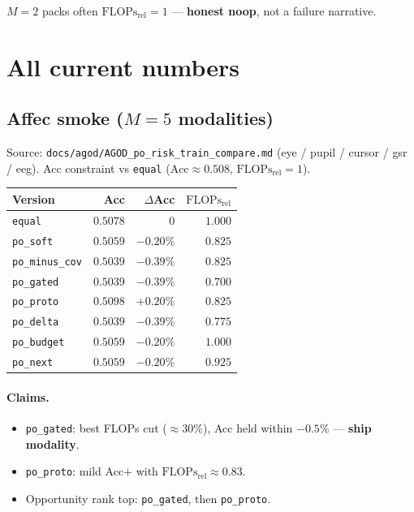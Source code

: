 \documentclass[11pt]{article}
\newcommand{\Flops}{\mathrm{FLOPs}_{\mathrm{rel}}}
\newcommand{\Acc}{\mathrm{Acc}}
\begin{document}
$M{=}2$ packs often $\Flops{=}1$ --- \textbf{honest noop}, not a failure
narrative.

\section{All current numbers}
\label{sec:data}

\subsection{Affec smoke ($M{=}5$ modalities)}
Source: \texttt{docs/agod/AGOD\_po\_risk\_train\_compare.md}
(eye / pupil / cursor / gsr / eeg).
Acc constraint vs \texttt{equal} ($\Acc\approx0.508$, $\Flops{=}1$).

\begin{center}
\small
\begin{tabular}{@{}lrrr@{}}
\toprule
Version & Acc & $\Delta$Acc & $\Flops$ \\
\midrule
\texttt{equal}       & $0.5078$ & $0$        & $1.000$ \\
\texttt{po\_soft}    & $0.5059$ & $-0.20\%$  & $0.825$ \\
\texttt{po\_minus\_cov}& $0.5039$ & $-0.39\%$ & $0.825$ \\
\texttt{po\_gated}   & $0.5039$ & $-0.39\%$  & $\mathbf{0.700}$ \\
\texttt{po\_proto}   & $0.5098$ & $+0.20\%$  & $0.825$ \\
\texttt{po\_delta}   & $0.5039$ & $-0.39\%$  & $0.775$ \\
\texttt{po\_budget}  & $0.5059$ & $-0.20\%$  & $1.000$ \\
\texttt{po\_next}    & $0.5059$ & $-0.20\%$  & $0.925$ \\
\bottomrule
\end{tabular}
\end{center}

\paragraph{Claims.}
\begin{itemize}[leftmargin=1.2em,itemsep=1pt]
  \item \texttt{po\_gated}: best FLOPs cut ($\approx30\%$), Acc held
        within $-0.5\%$ --- \textbf{ship modality}.
  \item \texttt{po\_proto}: mild Acc$+$ with $\Flops\approx0.83$.
  \item Opportunity rank top: \texttt{po\_gated}, then \texttt{po\_proto}.
\end{itemize}
\end{document}
